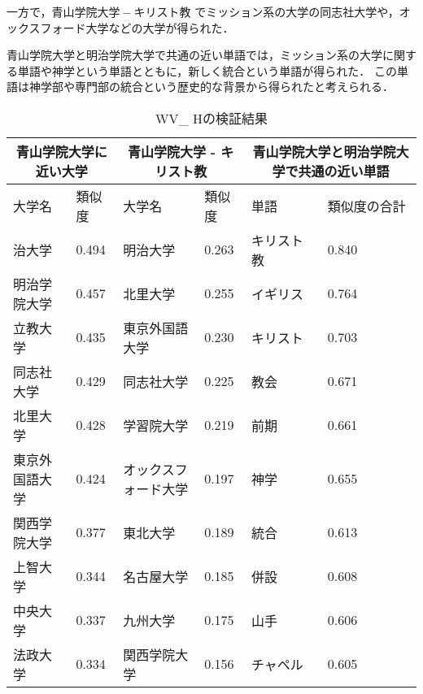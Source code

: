 一方で，$ 青山学院大学 - キリスト教 $ でミッション系の大学の同志社大学や，オックスフォード大学などの大学が得られた．

青山学院大学と明治学院大学で共通の近い単語では，ミッション系の大学に関する単語や神学という単語とともに，新しく統合という単語が得られた．
この単語は神学部や専門部の統合という歴史的な背景から得られたと考えられる．

\begin{table}[H]
\caption{WV\_ Hの検証結果}
\centering
\footnotesize
\begin{tabular}{ll|ll|ll}
\hline
\multicolumn{2}{c}{青山学院大学に近い大学} & \multicolumn{2}{c}{青山学院大学 - キリスト教} & \multicolumn{2}{c}{青山学院大学と明治学院大学で共通の近い単語}
\\ \hline
大学名 & 類似度 & 大学名 & 類似度 & 単語 & 類似度の合計
\\ \hline \hline
治大学 & 0.494 & 明治大学 & 0.263 & キリスト教 & 0.840\\
明治学院大学 & 0.457 & 北里大学 & 0.255 & イギリス & 0.764\\
立教大学 & 0.435 & 東京外国語大学 & 0.230 & キリスト & 0.703\\
同志社大学 & 0.429 & 同志社大学 & 0.225 & 教会 & 0.671\\
北里大学 & 0.428 & 学習院大学 & 0.219 & 前期 & 0.661\\
東京外国語大学 & 0.424 & オックスフォード大学 & 0.197 & 神学 & 0.655\\
関西学院大学 & 0.377 & 東北大学 & 0.189 & 統合 & 0.613\\
上智大学 & 0.344 & 名古屋大学 & 0.185 & 併設 & 0.608\\
中央大学 & 0.337 & 九州大学 & 0.175 & 山手 & 0.606\\
法政大学 & 0.334 & 関西学院大学 & 0.156 & チャペル & 0.605\\ \hline
\end{tabular}
\label{table:wvh}
\end{table}